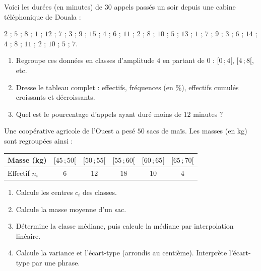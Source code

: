\documentclass[11pt]{article}
\newcounter{popsec}
\newcounter{popsub}
\newcommand{\courssub}[1]{%
  \stepcounter{popsub}%
  \par\vspace{9pt}\noindent{\popxbold\fontsize{11.5}{13}\selectfont\color{popink}{\color{poporange}\thepopsec.\thepopsub}\hspace{6pt}#1}\par\nopagebreak\vspace{4pt}
}
\begin{document}
\courssub{Je m'entraîne}

\begin{exercice}
Voici les durées (en minutes) de $30$ appels passés un soir depuis une cabine téléphonique de Douala :
\begin{center}
$2$ ; $5$ ; $8$ ; $1$ ; $12$ ; $7$ ; $3$ ; $9$ ; $15$ ; $4$ ; $6$ ; $11$ ; $2$ ; $8$ ; $10$ ; $5$ ; $13$ ; $1$ ; $7$ ; $9$ ; $3$ ; $6$ ; $14$ ; $4$ ; $8$ ; $11$ ; $2$ ; $10$ ; $5$ ; $7$.
\end{center}
\begin{enumerate}
\item Regroupe ces données en classes d'amplitude $4$ en partant de $0$ : $[0\,; 4[$, $[4\,; 8[$, etc.
\item Dresse le tableau complet : effectifs, fréquences (en \%), effectifs cumulés croissants et décroissants.
\item Quel est le pourcentage d'appels ayant duré moins de $12$ minutes ?
\end{enumerate}
\end{exercice}

\begin{exercice}
Une coopérative agricole de l'Ouest a pesé $50$ sacs de maïs. Les masses (en kg) sont regroupées ainsi :
\begin{center}
\begin{tabular}{|l|ccccc|}
\hline
\rowcolor{popblueL} Masse (kg) & $[45\,; 50[$ & $[50\,; 55[$ & $[55\,; 60[$ & $[60\,; 65[$ & $[65\,; 70[$ \\
\hline
Effectif $n_i$ & $6$ & $12$ & $18$ & $10$ & $4$ \\
\hline
\end{tabular}
\end{center}
\begin{enumerate}
\item Calcule les centres $c_i$ des classes.
\item Calcule la masse moyenne d'un sac.
\item Détermine la classe médiane, puis calcule la médiane par interpolation linéaire.
\item Calcule la variance et l'écart-type (arrondis au centième). Interprète l'écart-type par une phrase.
\end{enumerate}
\end{exercice}
\end{document}
